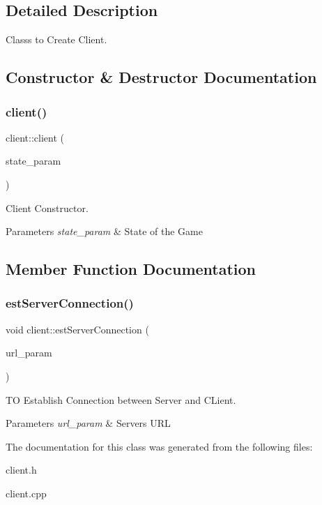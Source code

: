 \subsection{Detailed Description}
Classs to Create Client. 

\subsection{Constructor \& Destructor Documentation}
\mbox{\label{classclient_a9ea8d82dfe1a28c0e44d37a61eedef8d}} 
\subsubsection{\texorpdfstring{client()}{client()}}
{\footnotesize\ttfamily client\+::client (\begin{DoxyParamCaption}\item[{\hyperlink{classgamestate}{gamestate} $\ast$}]{state\+\_\+param }\end{DoxyParamCaption})}



Client Constructor. 


\begin{DoxyParams}{Parameters}
{\em state\+\_\+param} & State of the Game \\
\hline
\end{DoxyParams}


\subsection{Member Function Documentation}
\mbox{\label{classclient_a573ec47d9b5e3829ea9eab522dd17394}} 
\subsubsection{\texorpdfstring{est\+Server\+Connection()}{estServerConnection()}}
{\footnotesize\ttfamily void client\+::est\+Server\+Connection (\begin{DoxyParamCaption}\item[{Q\+Url}]{url\+\_\+param }\end{DoxyParamCaption})}



TO Establish Connection between Server and C\+Lient. 


\begin{DoxyParams}{Parameters}
{\em url\+\_\+param} & Server\textquotesingle{}s U\+RL \\
\hline
\end{DoxyParams}


The documentation for this class was generated from the following files\+:\begin{DoxyCompactItemize}
\item 
client.\+h\item 
client.\+cpp\end{DoxyCompactItemize}
